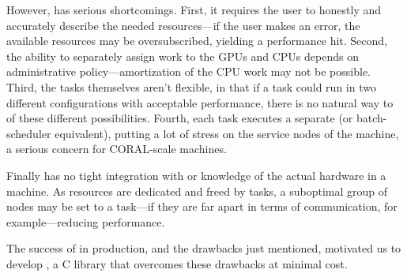 However, \metaq has serious shortcomings.
First, it requires the user to honestly and accurately describe the needed resources---if the user makes an error, the available resources may be oversubscribed, yielding a performance hit.
Second, the ability to separately assign work to the GPUs and CPUs depends on administrative policy---amortization of the CPU work may not be possible.
Third, the tasks themselves aren't flexible, in that if a task could run in two different configurations with acceptable performance, there is no natural way to \metaq of these different possibilities.
Fourth, each task executes a separate \mpirun (or batch-scheduler equivalent), putting a lot of stress on the service nodes of the machine, a serious concern for CORAL-scale machines.

Finally \metaq has no tight integration with or knowledge of the actual hardware in a machine.
As resources are dedicated and freed by tasks, a suboptimal group of nodes may be set to a task---if they are far apart in terms of communication, for example---reducing performance.

The success of \metaq in production, and the drawbacks just mentioned, motivated us to develop \mpijm, a C library that overcomes these drawbacks at minimal cost.
